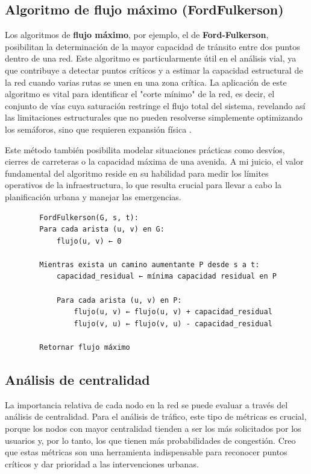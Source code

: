 \subsection{Algoritmo de flujo máximo (Ford\-Fulkerson)}
Los algoritmos de \textbf{flujo máximo}, por ejemplo, el de \textbf{Ford-Fulkerson}, posibilitan la determinación de la mayor capacidad de tránsito entre dos puntos dentro 
de una red. Este algoritmo es particularmente útil en el análisis vial, ya que contribuye a detectar puntos críticos y a estimar la capacidad estructural de la red cuando 
varias rutas se unen en una zona crítica. La aplicación de este algoritmo es vital para identificar el "corte mínimo" de la red, es decir, el conjunto de vías cuya saturación 
restringe el flujo total del sistema, revelando así las limitaciones estructurales que no pueden resolverse simplemente optimizando los semáforos, sino que requieren expansión 
física \cite{zhang_network_2024}.

Este método también posibilita modelar situaciones prácticas como desvíos, cierres de carreteras o la capacidad máxima de una avenida. A mi juicio, el valor fundamental del 
algoritmo reside en su habilidad para medir los límites operativos de la infraestructura, lo que resulta crucial para llevar a cabo la planificación urbana y manejar las 
emergencias.

\begin{listing}[H]
    \caption{Pseudocodigo del algoritmo Ford-Fulkerson}
    \label{lst:ford-fulkerson}
    \begin{verbatim}
        FordFulkerson(G, s, t):
        Para cada arista (u, v) en G:
            flujo(u, v) ← 0

        Mientras exista un camino aumentante P desde s a t:
            capacidad_residual ← mínima capacidad residual en P
            
            Para cada arista (u, v) en P:
                flujo(u, v) ← flujo(u, v) + capacidad_residual
                flujo(v, u) ← flujo(v, u) - capacidad_residual

        Retornar flujo máximo
    \end{verbatim}
\end{listing}

\subsection{Análisis de centralidad}
La importancia relativa de cada nodo en la red se puede evaluar a través del análisis de centralidad. Para el análisis de tráfico, este tipo de métricas es crucial, 
porque los nodos con mayor centralidad tienden a ser los más solicitados por los usuarios y, por lo tanto, los que tienen más probabilidades de congestión. Creo que estas 
métricas son una herramienta indispensable para reconocer puntos críticos y dar prioridad a las intervenciones urbanas.

